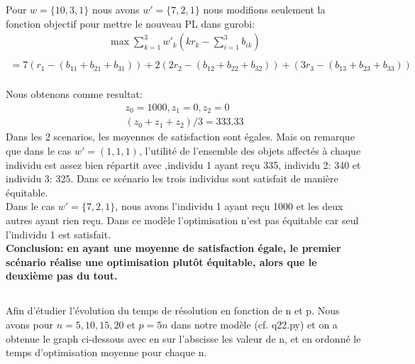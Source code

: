 \documentclass[16pt, a4paper]{article}
\begin{document}
\begin{flushleft}
\begin{justify}
Pour $w = \{10, 3 ,1\}$ nous avons $w' = \{7,2,1\}$ nous modifions seulement la fonction objectif pour mettre le nouveau PL dans gurobi: 
\begin{align*}
    \max \sum_{k=1}^3 w'_k(kr_k- \sum_{i=1}^3 b_{ik})\\ 
\end{align*}
\begin{align*}
    = 7(r_1 - (b_{11} + b_{21} + b_{31})) + 2(2r_2 - (b_{12} + b_{22} + b_{32})) + (3r_3 - (b_{13} + b_{23} + b_{33}))\\
\end{align*}

Nous obtenons comme resultat:
\begin{align*}
    z_0 = 1000 , z_1 = 0, z_2 = 0\\
    (z_0  + z_1 + z_2)/3= 333.33
\end{align*}
 Dans les 2 scenarios, les moyennes de satisfaction sont égales. Mais on remarque que dans le cas $w' = (1,1,1)$, l'utilité de l'ensemble des objets affectés à chaque individu est assez bien répartit avec ,individu 1 ayant reçu 335, individu 2: 340 et individu 3: 325. Dans ce scénario les trois individus sont satisfait de manière équitable.\\
Dans le cas $w' = \{7,2,1\}$, nous avons l'individu 1 ayant reçu 1000 et les deux autres ayant rien reçu. Dans ce modèle l'optimisation n'est pas équitable car seul l'individu 1 est satisfait.\\ 
\textbf{Conclusion: en ayant une moyenne de satisfaction égale, le premier scénario réalise une optimisation plutôt équitable, alors que le deuxième pas du tout.}

\subsection{}
Afin d'étudier l'évolution du temps de résolution en fonction de n et p. Nous avons pour $n = 5, 10 ,15 ,20$ et $p = 5n$ dans notre modèle (cf. q22.py) et on a obtenue le graph ci-dessous avec en sur l'abscisse les valeur de n, et en ordonné le temps d'optimisation moyenne pour chaque n.


\end{justify}
\end{flushleft}
\end{document}

